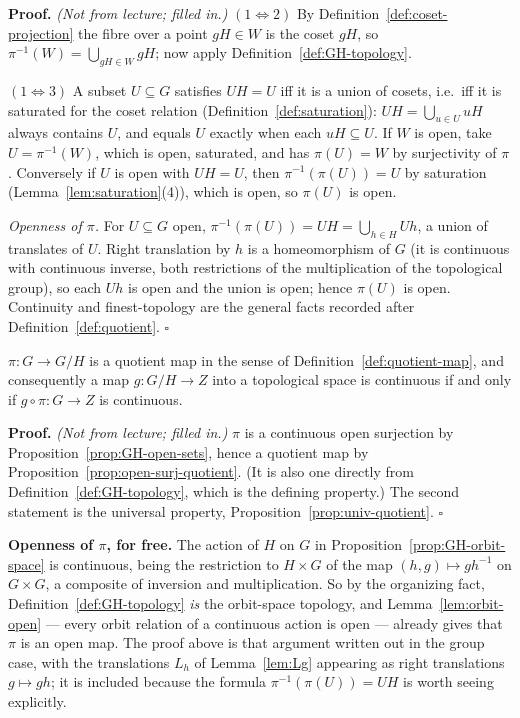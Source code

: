 \documentclass[11pt]{report}
\makeatletter
\newcounter{thmcounter}[section]
\renewenvironment{proof}[1][Proof]{\noindent\textbf{#1.} }{\hfill$\square$\par\vspace{5pt}}
\newcommand{\thmlabel}[1]{\edef\@currentlabel{\arabic{section}.\arabic{thmcounter}}\label{#1}}
\newcommand{\leeref}[1]{\par\smallskip{\raggedleft\footnotesize\textsc{Lee}:\ #1\par}}
\makeatother
\begin{document}
\begin{proof}
\textit{(Not from lecture; filled in.)} $(1 \Leftrightarrow 2)$ By Definition~\ref{def:coset-projection} the fibre over a point $gH \in W$ is the coset $gH$, so $\pi^{-1}(W) = \bigcup_{gH \in W} gH$; now apply Definition~\ref{def:GH-topology}.

$(1 \Leftrightarrow 3)$ A subset $U \subseteq G$ satisfies $UH = U$ iff it is a union of cosets, i.e.\ iff it is saturated for the coset relation (Definition~\ref{def:saturation}): $UH = \bigcup_{u \in U} uH$ always contains $U$, and equals $U$ exactly when each $uH \subseteq U$. If $W$ is open, take $U = \pi^{-1}(W)$, which is open, saturated, and has $\pi(U) = W$ by surjectivity of $\pi$. Conversely if $U$ is open with $UH = U$, then $\pi^{-1}(\pi(U)) = U$ by saturation (Lemma~\ref{lem:saturation}(4)), which is open, so $\pi(U)$ is open.

\emph{Openness of $\pi$.} For $U \subseteq G$ open, $\pi^{-1}(\pi(U)) = UH = \bigcup_{h \in H} Uh$, a union of translates of $U$. Right translation by $h$ is a homeomorphism of $G$ (it is continuous with continuous inverse, both restrictions of the multiplication of the topological group), so each $Uh$ is open and the union is open; hence $\pi(U)$ is open. Continuity and finest-topology are the general facts recorded after Definition~\ref{def:quotient}.
\end{proof}

\begin{corbox}\thmlabel{cor:GH-quotient-map}
$\pi : G \to G/H$ is a quotient map in the sense of Definition~\ref{def:quotient-map}, and consequently a map $g : G/H \to Z$ into a topological space is continuous if and only if $g \circ \pi : G \to Z$ is continuous.
\leeref{Theorem 21.17}
\end{corbox}

\begin{proof}
\textit{(Not from lecture; filled in.)} $\pi$ is a continuous open surjection by Proposition~\ref{prop:GH-open-sets}, hence a quotient map by Proposition~\ref{prop:open-surj-quotient}. (It is also one directly from Definition~\ref{def:GH-topology}, which is the defining property.) The second statement is the universal property, Proposition~\ref{prop:univ-quotient}.
\end{proof}

\begin{rembox}\label{rem:homogeneous-4}
\textbf{Openness of $\pi$, for free.} The action of $H$ on $G$ in Proposition~\ref{prop:GH-orbit-space} is continuous, being the restriction to $H \times G$ of the map $(h,g) \mapsto gh^{-1}$ on $G \times G$, a composite of inversion and multiplication. So by the organizing fact, Definition~\ref{def:GH-topology} \emph{is} the orbit-space topology, and Lemma~\ref{lem:orbit-open} --- every orbit relation of a continuous action is open --- already gives that $\pi$ is an open map. The proof above is that argument written out in the group case, with the translations $L_h$ of Lemma~\ref{lem:Lg} appearing as right translations $g \mapsto gh$; it is included because the formula $\pi^{-1}(\pi(U)) = UH$ is worth seeing explicitly.
\end{rembox}
\end{document}
